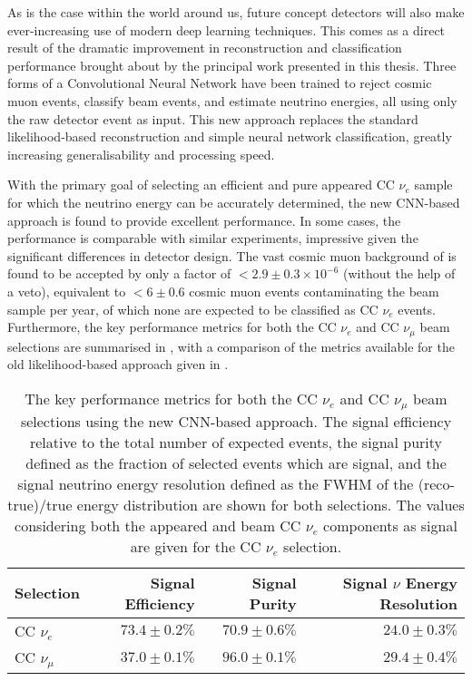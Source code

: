 As is the case within the world around us, future \chips concept detectors will also make
ever-increasing use of modern deep learning techniques. This comes as a direct result of the
dramatic improvement in \chipsfive reconstruction and classification performance brought about by
the principal work presented in this thesis. Three forms of a Convolutional Neural Network have
been trained to reject cosmic muon events, classify beam events, and estimate neutrino energies,
all using only the raw detector event as input. This new approach replaces the standard
likelihood-based reconstruction and simple neural network classification, greatly increasing
generalisability and processing speed.

With the primary goal of selecting an efficient and pure appeared CC $\nu_{e}$ sample for which
the neutrino energy can be accurately determined, the new CNN-based approach is found to provide
excellent performance. In some cases, the performance is comparable with similar experiments,
impressive given the significant differences in detector design. The vast cosmic muon background
of \chipsfive is found to be accepted by only a factor of $<2.9\pm0.3\times10^{-6}$ (without the
help of a veto), equivalent to $<6\pm0.6$ cosmic muon events contaminating the beam sample per
year, of which none are expected to be classified as CC $\nu_{e}$ events. Furthermore, the key
performance metrics for both the CC $\nu_{e}$ and CC $\nu_{\mu}$ beam selections are summarised in
, with a comparison of the metrics available for the old
likelihood-based approach given in .

\begin{table}
    \begin{tabular}{lrrr}
        Selection           & Signal Efficiency & Signal Purity & Signal $\nu$ Energy Resolution \\
        \midrule
        CC $\nu_{e}$     & $73.4\pm0.2\%$ & $70.9\pm0.6\%$ & $24.0\pm0.3\%$ \\
        CC $\nu_{\mu}$   & $37.0\pm0.1\%$ & $96.0\pm0.1\%$ & $29.4\pm0.4\%$ \\
    \end{tabular}
    \caption[Key performance metrics of the new CNN approach]
    {The key performance metrics for both the CC $\nu_{e}$ and CC $\nu_{\mu}$ beam selections
        using the new CNN-based approach. The signal efficiency relative to the total number of
        expected events, the signal purity defined as the fraction of selected events which are
        signal, and the signal neutrino energy resolution defined as the FWHM of the
        (reco-true)/true energy distribution are shown for both selections. The values considering
        both the appeared and beam CC $\nu_{e}$ components as signal are given for the CC
        $\nu_{e}$ selection.}
    \label{tab:final_metrics}
\end{table}

